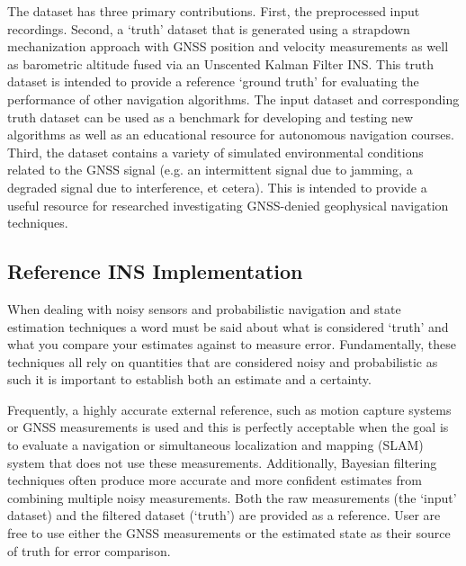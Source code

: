 \documentclass[sageh,times]{sagej}
\begin{document}
The dataset has three primary contributions. First, the preprocessed input recordings. Second, a `truth' dataset that is generated using a strapdown mechanization approach with GNSS position and velocity measurements as well as barometric altitude fused via an Unscented Kalman Filter INS. This truth dataset is intended to provide a reference `ground truth' for evaluating the performance of other navigation algorithms. The input dataset and corresponding truth dataset can be used as a benchmark for developing and testing new algorithms as well as an educational resource for autonomous navigation courses. Third, the dataset contains a variety of simulated environmental conditions related to the GNSS signal (e.g. an intermittent signal due to jamming, a degraded signal due to interference, et cetera). This is intended to provide a useful resource for researched investigating GNSS-denied geophysical navigation techniques.

\subsection{Reference INS Implementation}
When dealing with noisy sensors and probabilistic navigation and state estimation techniques a word must be said about what is considered `truth' and what you compare your estimates against to measure error. Fundamentally, these techniques all rely on quantities that are considered noisy and probabilistic as such it is important to establish both an estimate and a certainty. 

Frequently, a highly accurate external reference, such as motion capture systems or GNSS measurements is used and this is perfectly acceptable when the goal is to evaluate a navigation or simultaneous localization and mapping (SLAM) system that does not use these measurements. Additionally, Bayesian filtering techniques often produce more accurate and more confident estimates from combining multiple noisy measurements. Both the raw measurements (the `input' dataset) and the filtered dataset (`truth') are provided as a reference. User are free to use either the GNSS measurements or the estimated state as their source of truth for error comparison.
\end{document}
